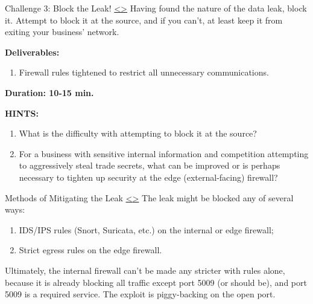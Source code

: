\documentclass[12pt]{extarticle}
\newenvironment{instructionblock}{\Large\bgroup}{\egroup}
\newcommand{\ben}{\begin{enumerate}}
\newcommand{\een}{\end{enumerate}}
\begin{document}





\pagebreak
\begin{slide}{ Challenge 3: Block the Leak! }{ \hyperref[slide 12]{\textless}\hyperref[slide 14]{\textgreater} }
\vskip 5pt
\begin{instructionblock}
	Having found the nature of the data leak, block it. Attempt to block it at the source, and if you can't, at least keep it from exiting your business' network.


	\textbf{\Large{Deliverables:}}
	\ben
		\item Firewall rules tightened to restrict all unnecessary communications.
	\een

  \vspace{20mm}
  \begin{center}
  \textbf{\Large{Duration: 10-15 min.} }
  \end{center}

\end{instructionblock}
\end{slide}  


\vspace{8mm}
\noindent
\textbf{HINTS:}
\begin{enumerate}
	\item What is the difficulty with attempting to block it at the source?
	\item For a business with sensitive internal information and competition attempting to aggressively steal trade secrets, what can be improved or is perhaps necessary to tighten up security at the edge (external-facing) firewall?
\end{enumerate}








\pagebreak
\begin{slide}{ Methods of Mitigating the Leak }{ \hyperref[slide 13]{\textless}\hyperref[slide 15]{\textgreater} }
\vskip 5pt
\begin{instructionblock}
	The leak might be blocked any of several ways:
	\ben
	\item IDS/IPS rules (Snort, Suricata, etc.) on the internal or edge firewall;
	\item Strict egress rules on the edge firewall.
	\een
	
	Ultimately, the internal firewall can't be made any stricter with rules alone, because it is already blocking all traffic except port 5009 (or should be), and port 5009 is a required service. The exploit is piggy-backing on the open port.
	
\end{instructionblock}
\end{slide}
\end{document}
